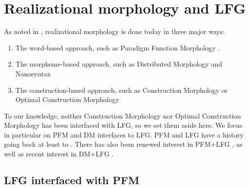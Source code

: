 \documentclass[output=paper,hidelinks]{langscibook}
\begin{document}

\section{Realizational morphology and LFG}
\label{sec:Morph:real-morph-lfg}

As noted in , realizational
morphology is done today in three major ways:
%
\begin{enumerate}
\item The word-based approach, such as Paradigm Function Morphology
  \citep{Stu01,stump16,spencer13}.
\item The morpheme-based approach, such as  Distributed Morphology
  \citep{hallemarantz} and Nanosyntax \citep{Sta09,caha09}
\item The construction-based approach, such as Construction Morphology
\citep{Booij2010}  or Optimal Construction
  Morphology \citep{caballero08}
\end{enumerate}
%
To our knowledge, neither Construction Morphology nor Optimal
Construction Morphology has been interfaced with LFG, so we set them 
aside here. We focus in particular on PFM and DM interfaces to
LFG. PFM and LFG have a history going back at least to
\citet{sadler2004projecting}. There has also been renewed interest in
PFM+LFG \citep{dalrymple15,DLM:LFG}, as well as recent interest in
DM+LFG
\citep{Melchin2020,asudeh;ea21,everdell:beyond,asudeh;siddiqi-lfg22}.


\subsection{LFG interfaced with PFM}
\label{sec:Morph:lfg-pfm}
\end{document}
